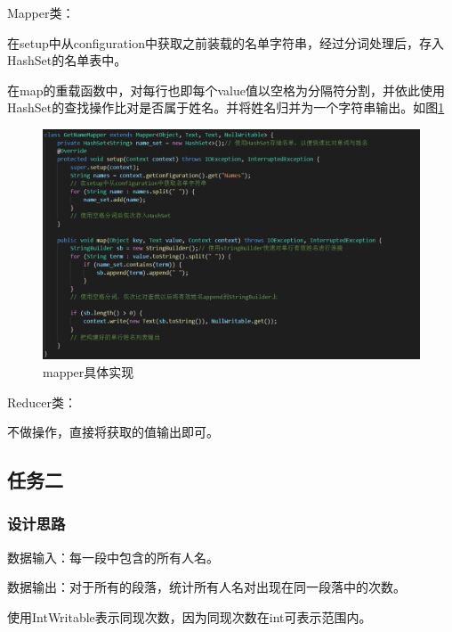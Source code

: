 \documentclass[a4paper,UTF8]{article}
\numberwithin{equation}{section}
\begin{document}
\par Mapper类：
\par 在setup中从configuration中获取之前装载的名单字符串，经过分词处理后，存入HashSet的名单表中。
\par 在map的重载函数中，对每行也即每个value值以空格为分隔符分割，并依此使用HashSet的查找操作比对是否属于姓名。并将姓名归并为一个字符串输出。如图\ref{task1-mapper}
\begin{figure}[htbp]
    \centering
    \includegraphics[width = 15cm]{task1-mapper.png}
    \caption{mapper具体实现}
    \label{task1-mapper}
\end{figure}

\par Reducer类：
\par 不做操作，直接将获取的值输出即可。

\subsection{任务二}
\subsubsection{设计思路}
\par 数据输入：每一段中包含的所有人名。
\par 数据输出：对于所有的段落，统计所有人名对出现在同一段落中的次数。
\par 使用IntWritable表示同现次数，因为同现次数在int可表示范围内。
\end{document}

